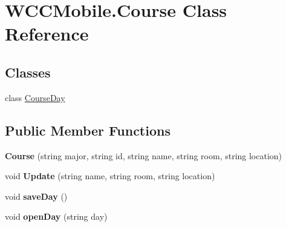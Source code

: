 \hypertarget{class_w_c_c_mobile_1_1_course}{}\section{W\+C\+C\+Mobile.\+Course Class Reference}
\label{class_w_c_c_mobile_1_1_course}
\subsection*{Classes}
\begin{DoxyCompactItemize}
\item 
class \hyperlink{class_w_c_c_mobile_1_1_course_1_1_course_day}{Course\+Day}
\end{DoxyCompactItemize}
\subsection*{Public Member Functions}
\begin{DoxyCompactItemize}
\item 
{\bfseries Course} (string major, string id, string name, string room, string location)\hypertarget{class_w_c_c_mobile_1_1_course_a73a6256a29af0192b8e7a223128e59c2}{}\label{class_w_c_c_mobile_1_1_course_a73a6256a29af0192b8e7a223128e59c2}

\item 
void {\bfseries Update} (string name, string room, string location)\hypertarget{class_w_c_c_mobile_1_1_course_a9786503256bc02ba3cf58bcd53db0f24}{}\label{class_w_c_c_mobile_1_1_course_a9786503256bc02ba3cf58bcd53db0f24}

\item 
void {\bfseries save\+Day} ()\hypertarget{class_w_c_c_mobile_1_1_course_ac8ce394dc4c262471d99ba5aea7f338b}{}\label{class_w_c_c_mobile_1_1_course_ac8ce394dc4c262471d99ba5aea7f338b}

\item 
void {\bfseries open\+Day} (string day)\hypertarget{class_w_c_c_mobile_1_1_course_af803afd7bdb3b0cde9dde88e17796b66}{}\label{class_w_c_c_mobile_1_1_course_af803afd7bdb3b0cde9dde88e17796b66}

\end{DoxyCompactItemize}
